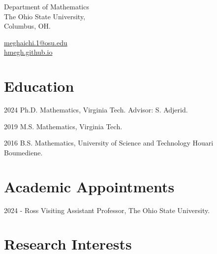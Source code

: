\documentclass[11pt,letterpaper]{report}
\begin{document}
    \raggedright{}

    \namefont{\myname}

    \vspace{1em}
    \begin{minipage}[t]{0.700\textwidth}
        Department of Mathematics \\
       The Ohio State University,  \\
        Columbus, OH.  
    \end{minipage}\begin{minipage}[t]{0.295\textwidth}
        \flushright{}
        \href{mailto:meghaichi.1@osu.edu}{meghaichi.1@osu.edu} \\
        \href{https://hmegh.github.io}{hmegh.github.io}
    \end{minipage}

  


    \section*{Education}

    \begin{tablist}

        \item[2024] \tab{} Ph.D.\tab{} Mathematics, Virginia Tech. Advisor: S. Adjerid.
        \item[2019]  \tab{} M.S.\tab{} Mathematics, Virginia Tech.
        \item[2016]  \tab{} B.S.\tab{} Mathematics, University of Science and Technology Houari Boumediene.

    \end{tablist}


    \section*{Academic Appointments}
    \begin{tablist}
        \item[2024 -] \tab{} Ross Visiting Assistant Professor, The Ohio State University.
    \end{tablist}


    \section*{Research Interests}
\end{document}
